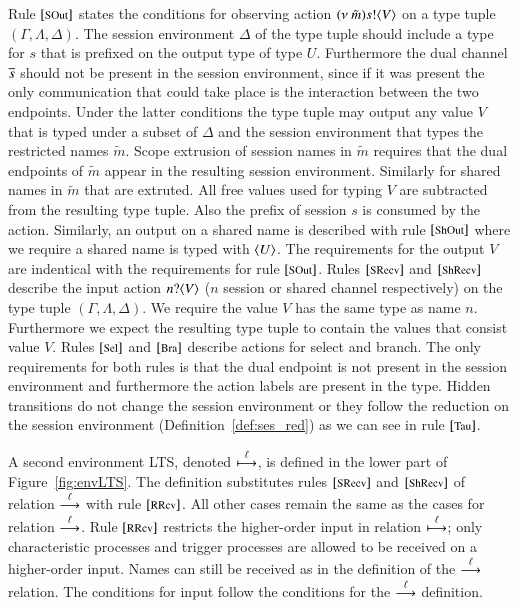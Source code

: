 Rule ${\footnotesize [\textrm{SOut}]}$ states the conditions for observing action
$(\nu\ \tilde{m}) s ! \langle V \rangle$ on a type tuple $(\Gamma, \Lambda, \Delta)$. 
The session environment $\Delta$ of the type tuple should include
a type for $s$ that is prefixed on the output type of type $U$.
Furthermore the dual channel $\overline{s}$ should not be
present in the session environment, since if it was present
the only communication that could take place is the interaction
between the two endpoints.
Under the latter conditions the type tuple may output any
value $V$ that is typed under a subset of $\Delta$ and
the session environment that types the restricted names
$\tilde{m}$. Scope extrusion of session names in $\tilde{m}$ requires
that the dual endpoints of $\tilde{m}$ appear in
the resulting session environment. Similarly for shared names
in $\tilde{m}$ that are extruted.
All free values used for typing $V$ are subtracted from the
resulting type tuple. Also the prefix of session $s$ is consumed
by the action.
Similarly, an output on a shared name is described
with rule ${\footnotesize [\textrm{ShOut}]}$ where we require a shared name
is typed with $\langle U \rangle$. The requirements for
the output $V$ are indentical with the requirements for
rule ${\footnotesize [\textrm{SOut}]}$.
Rules ${\footnotesize [\textrm{SRecv}]}$ and ${\footnotesize [\textrm{ShRecv}]}$ describe
the input action $n ? \langle V \rangle$ ($n$ session or shared channel respectively)
on the type tuple $(\Gamma, \Lambda, \Delta)$.
We require the value $V$ has the same type as name $n$. Furthermore
we expect the resulting type tuple to contain the values that
consist value $V$.
Rules ${\footnotesize [\textrm{Sel}]}$ and ${\footnotesize [\textrm{Bra}]}$ describe actions for
select and branch. The only requirements for both
rules is that the dual endpoint is not present in the session
environment and furthermore the action labels are present
in the type.
Hidden transitions do not change the session environment
or they follow the reduction on the session
environment (Definition~\ref{def:ses_red}) as we can see in rule
${\footnotesize [\textrm{Tau}]}$.

A second environment LTS, denoted $\stackrel{\ell}{\longmapsto}$,
is defined in the lower part of Figure~\ref{fig:envLTS}.
The definition substitutes rules
${\footnotesize [\textrm{SRecv}]}$ and ${\footnotesize [\textrm{ShRecv}]}$
of relation $\stackrel{\ell}{\longrightarrow}$ with rule ${\footnotesize [\textrm{RRcv}]}$.
All other cases remain the same as the cases for
relation $\stackrel{\ell}{\longrightarrow}$.
Rule ${\footnotesize [\textrm{RRcv}]}$ restricts the higher-order input
in relation $\stackrel{\ell}{\longmapsto}$;
only characteristic processes and trigger processes
are allowed to be received on a higher-order input.
Names can still be received as in the definition of
the $\stackrel{\ell}{\longrightarrow}$ relation.
The conditions for input follow the conditions
for the $\stackrel{\ell}{\longrightarrow}$ definition.

